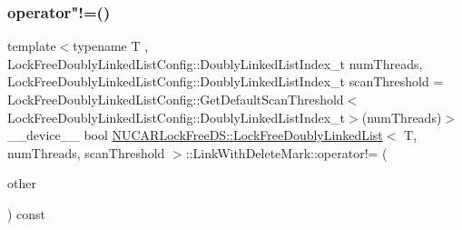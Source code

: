 \subsubsection{\texorpdfstring{operator"!=()}{operator!=()}}
{\footnotesize\ttfamily template$<$typename T , Lock\+Free\+Doubly\+Linked\+List\+Config\+::\+Doubly\+Linked\+List\+Index\+\_\+t num\+Threads, Lock\+Free\+Doubly\+Linked\+List\+Config\+::\+Doubly\+Linked\+List\+Index\+\_\+t scan\+Threshold = Lock\+Free\+Doubly\+Linked\+List\+Config\+::\+Get\+Default\+Scan\+Threshold$<$\+Lock\+Free\+Doubly\+Linked\+List\+Config\+::\+Doubly\+Linked\+List\+Index\+\_\+t$>$(num\+Threads)$>$ \\
\+\_\+\+\_\+device\+\_\+\+\_\+ bool \mbox{\hyperlink{class_n_u_c_a_r_lock_free_d_s_1_1_lock_free_doubly_linked_list}{N\+U\+C\+A\+R\+Lock\+Free\+D\+S\+::\+Lock\+Free\+Doubly\+Linked\+List}}$<$ T, num\+Threads, scan\+Threshold $>$\+::Link\+With\+Delete\+Mark\+::operator!= (\begin{DoxyParamCaption}\item[{const \mbox{\hyperlink{class_n_u_c_a_r_lock_free_d_s_1_1_lock_free_doubly_linked_list_1_1_link_with_delete_mark}{Link\+With\+Delete\+Mark}} \&}]{other }\end{DoxyParamCaption}) const\hspace{0.3cm}{\ttfamily [inline]}}

\mbox{\label{class_n_u_c_a_r_lock_free_d_s_1_1_lock_free_doubly_linked_list_1_1_link_with_delete_mark_afa41d48d9810b94ed0f2b3d1b6fd52a8}} 
